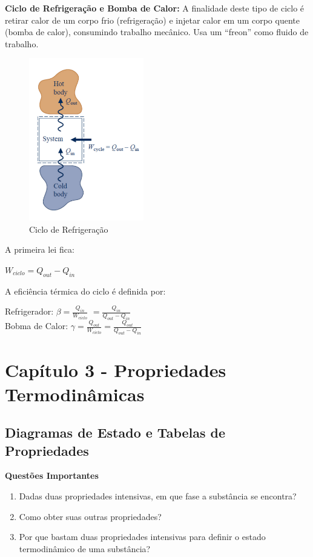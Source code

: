 \documentclass[a4paper, 12pt]{article}
\begin{document}
\newpage
\textbf{Ciclo de Refrigeração e Bomba de Calor:} A finalidade deste tipo de ciclo é retirar calor de um corpo frio (refrigeração) e injetar calor em um corpo quente (bomba de calor), consumindo trabalho mecânico. Usa um “freon” como fluido de trabalho.
	\begin{figure}[h]
		\includegraphics[width = 5cm]{cr.png}
		\centering
		\caption{Ciclo de Refrigeração}
	\end{figure}

A primeira lei fica:
	\begin{center}
		\large
		$ W_{ciclo}  = Q_{out} - Q_{in}$
	\end{center}

A eficiência térmica do ciclo é definida por:
	\begin{center}
		\large
		Refrigerador: $ \beta = \frac{Q_{in}}{W_{ciclo}} $ $ = \frac{Q_{in}}{Q_{out} - Q_{in}} $\\
		Bobma de Calor: $ \gamma  = \frac{Q_{out}}{W_{ciclo}} = \frac{Q_{out}}{Q_{out} - Q_{in}}$
	\end{center}


\newpage
\section{Capítulo 3 - Propriedades Termodinâmicas}
\subsection{Diagramas de Estado e Tabelas de Propriedades}
\textbf{Questões Importantes}
	\begin{enumerate}
		\item Dadas duas propriedades intensivas, em que fase a
		substância se encontra?
		
		\item Como obter suas outras propriedades?
		
		\item Por que bastam duas propriedades intensivas para
		definir o estado termodinâmico de uma substância?
	\end{enumerate}
\end{document}
